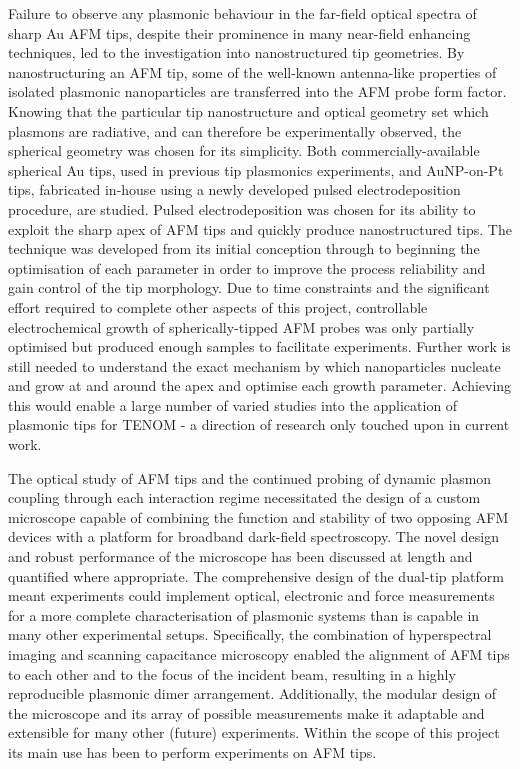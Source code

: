 \documentclass[12pt, a4paper, oneside]{book}
\begin{document}
Failure to observe any plasmonic behaviour in the far-field optical spectra of sharp Au AFM tips, despite their prominence in many near-field enhancing techniques, led to the investigation into nanostructured tip geometries. By nanostructuring an AFM tip, some of the well-known antenna-like properties of isolated plasmonic nanoparticles are transferred into the AFM probe form factor. Knowing that the particular tip nanostructure and optical geometry set which plasmons are radiative, and can therefore be experimentally observed, the spherical geometry was chosen for its simplicity. Both commercially-available spherical Au tips, used in previous tip plasmonics experiments, and AuNP-on-Pt tips, fabricated in-house using a newly developed pulsed electrodeposition procedure, are studied. Pulsed electrodeposition was chosen for its ability to exploit the sharp apex of AFM tips and quickly produce nanostructured tips. The technique was developed from its initial conception through to beginning the optimisation of each parameter in order to improve the process reliability and gain control of the tip morphology. Due to time constraints and the significant effort required to complete other aspects of this project, controllable electrochemical growth of spherically-tipped AFM probes was only partially optimised but produced enough samples to facilitate experiments.
Further work is still needed to understand the exact mechanism by which nanoparticles nucleate and grow at and around the apex and optimise each growth parameter. Achieving this would enable a large number of varied studies into the application of plasmonic tips for TENOM - a direction of research only touched upon in current work.

The optical study of AFM tips and the continued probing of dynamic plasmon coupling through each interaction regime necessitated the design of a custom microscope capable of combining the function and stability of two opposing AFM devices with a platform for broadband dark-field spectroscopy. The novel design and robust performance of the microscope has been discussed at length and quantified where appropriate. The comprehensive design of the dual-tip platform meant experiments could implement optical, electronic and force measurements for a more complete characterisation of plasmonic systems than is capable in many other experimental setups. Specifically, the combination of hyperspectral imaging and scanning capacitance microscopy enabled the alignment of AFM tips to each other and to the focus of the incident beam, resulting in a highly reproducible plasmonic dimer arrangement. Additionally, the modular design of the microscope and its array of possible measurements make it adaptable and extensible for many other (future) experiments. Within the scope of this project its main use has been to perform experiments on AFM tips.
\end{document}
